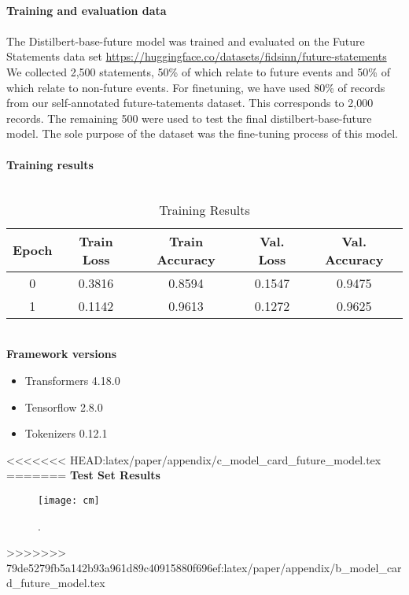 \\
\textbf{Training and evaluation data}
\\
\\
The Distilbert-base-future model was trained and evaluated on the Future Statements data set \url{https://huggingface.co/datasets/fidsinn/future-statements}
We collected 2,500 statements, 50\% of which relate to future events and 50\% of which relate to non-future events.
For finetuning, we have used 80\% of records from our self-annotated future-tatements dataset. This corresponds to 2,000 records.
The remaining 500 were used to test the final distilbert-base-future model.
The sole purpose of the dataset was the fine-tuning process of this model.
\\
\\
\textbf{Training results}
\\
\\
\begin{table}[ht]
    \scriptsize
    \setlength\tabcolsep{10pt} %
    \footnotesize\centering
    \begin{tabular}{ccccc}
        \toprule
        \textbf{Epoch} & \textbf{Train Loss} & \textbf{Train Accuracy} & \textbf{Val. Loss} & \textbf{Val. Accuracy} \\
        \midrule
        0 & 0.3816 & 0.8594 & 0.1547 & 0.9475 \\
        1 & 0.1142 & 0.9613 & 0.1272 & 0.9625 \\
        \bottomrule
    \end{tabular}
    \caption{\label{future-model-train}
    Training Results
    }
\end{table}
%
%
\\
\textbf{Framework versions}
\begin{itemize}
    \item Transformers 4.18.0
    \item Tensorflow 2.8.0
    \item Tokenizers 0.12.1
\end{itemize}%
<<<<<<< HEAD:latex/paper/appendix/c_model_card_future_model.tex
=======
%
\pagebreak
\textbf{Test Set Results}
\begin{figure}[h]
    \centering
    \texttt{[image: cm]}
    \caption{
        .
    }
    \label{fig:cm}
\end{figure}
>>>>>>> 79de5279fb5a142b93a961d89c40915880f696ef:latex/paper/appendix/b_model_card_future_model.tex
